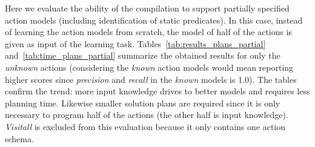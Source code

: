 \documentclass[letterpaper]{article} %
\begin{document}
Here we evaluate the ability of the compilation to support partially specified action models (including identification of static predicates). In this case, instead of learning the action models from scratch, the model of half of the actions is given as input of the learning task. Tables~\ref{tab:results_plans_partial} and~\ref{tab:time_plans_partial} summarize the obtained results for only the {\em unknown} actions (considering the {\em known} action models would mean reporting higher scores since {\em precision} and {\em recall} in the {\em known} models is 1.0). The tables confirm the trend: more input knowledge drives to better models and requires less planning time. Likewise smaller solution plans are required since it is only necessary to program half of the actions (the other half is input knowledge). {\em Visitall} is excluded from this evaluation because it only contains one action schema.

\begin{table}
\begin{footnotesize}
	\begin{center}
	\end{center}
\end{footnotesize}
\caption{\small {\em Precision} and {\em recall} in the learned models starting from partially specified actions.}
\label{tab:results_plans_partial}
\end{table}
\end{document}
